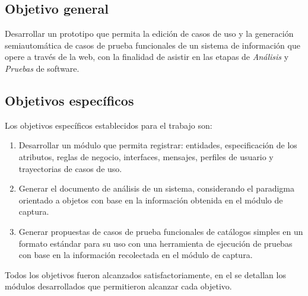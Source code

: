\subsection{Objetivo general}

	Desarrollar un prototipo que permita la edición de casos de uso y la generación semiautomática de casos de prueba funcionales de un sistema de información que opere a través de la web, con la finalidad de asistir en las etapas de {\it Análisis} y {\it Pruebas} de software. 

\subsection{Objetivos específicos}

	Los objetivos específicos establecidos para el trabajo son:
	
	\begin{enumerate}
		\item Desarrollar un módulo que permita registrar: entidades, especificación de los atributos,  reglas de negocio, interfaces, mensajes, perfiles de usuario y trayectorias de casos de uso. 
		\item Generar el documento de análisis de un sistema, considerando el paradigma orientado a objetos con base en la información obtenida en el módulo de captura.
		\item Generar propuestas de casos de prueba funcionales de catálogos simples en un formato estándar para su uso con una herramienta de ejecución de pruebas con base en la información recolectada en el módulo de captura.
	\end{enumerate}
	
	
	Todos los objetivos fueron alcanzados satisfactoriamente, en el  se detallan los módulos desarrollados que permitieron alcanzar cada objetivo.